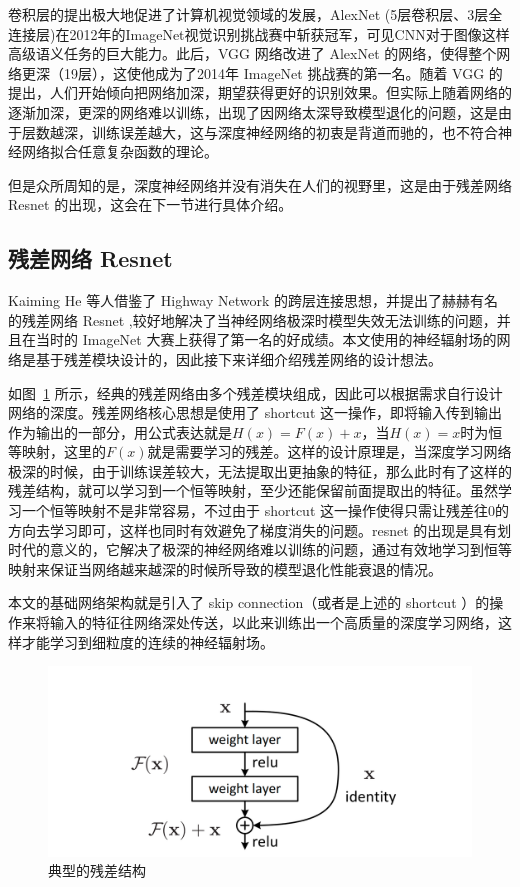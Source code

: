 卷积层的提出极大地促进了计算机视觉领域的发展，AlexNet\cite{2012ImageNet} (5层卷积层、3层全连接层)在2012年的ImageNet视觉识别挑战赛中斩获冠军，可见CNN对于图像这样高级语义任务的巨大能力。此后，VGG\cite{simonyan2014very} 网络改进了 AlexNet 的网络，使得整个网络更深（19层），这使他成为了2014年 ImageNet 挑战赛的第一名。随着 VGG 的提出，人们开始倾向把网络加深，期望获得更好的识别效果。但实际上随着网络的逐渐加深，更深的网络难以训练，出现了因网络太深导致模型退化的问题，这是由于层数越深，训练误差越大，这与深度神经网络的初衷是背道而驰的，也不符合神经网络拟合任意复杂函数的理论。

但是众所周知的是，深度神经网络并没有消失在人们的视野里，这是由于残差网络 Resnet 的出现，这会在下一节进行具体介绍。
\subsection{残差网络 Resnet}
Kaiming He 等人借鉴了 Highway Network\cite{srivastava2015highway} 的跨层连接思想，并提出了赫赫有名的残差网络 Resnet\cite{he2016deep} ,较好地解决了当神经网络极深时模型失效无法训练的问题，并且在当时的 ImageNet 大赛上获得了第一名的好成绩。本文使用的神经辐射场的网络是基于残差模块设计的，因此接下来详细介绍残差网络的设计想法。

如图~\ref{fig:resnet} 所示，经典的残差网络由多个残差模块组成，因此可以根据需求自行设计网络的深度。残差网络核心思想是使用了 shortcut 这一操作，即将输入传到输出作为输出的一部分，用公式表达就是$H(x) = F(x) + x$，当$H(x) = x$时为恒等映射，这里的$F(x)$就是需要学习的残差。这样的设计原理是，当深度学习网络极深的时候，由于训练误差较大，无法提取出更抽象的特征，那么此时有了这样的残差结构，就可以学习到一个恒等映射，至少还能保留前面提取出的特征。虽然学习一个恒等映射不是非常容易，不过由于 shortcut 这一操作使得只需让残差往0的方向去学习即可，这样也同时有效避免了梯度消失的问题。resnet 的出现是具有划时代的意义的，它解决了极深的神经网络难以训练的问题，通过有效地学习到恒等映射来保证当网络越来越深的时候所导致的模型退化性能衰退的情况。

本文的基础网络架构就是引入了 skip connection（或者是上述的 shortcut ）的操作来将输入的特征往网络深处传送，以此来训练出一个高质量的深度学习网络，这样才能学习到细粒度的连续的神经辐射场。

\begin{figure}[t]
    \centering
    \includegraphics[width=0.7\linewidth]{figures/resnet.jpg}
    \caption{典型的残差结构}
    \label{fig:resnet}
\end{figure}

